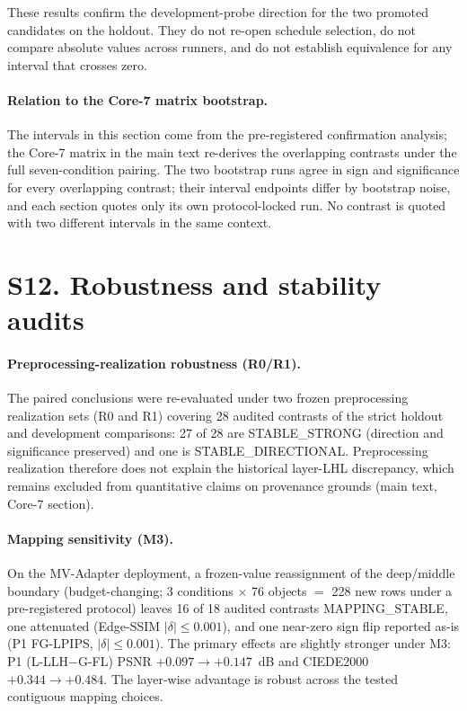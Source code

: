 \documentclass[10pt]{article}
\begin{document}
These results confirm the development-probe direction for the two promoted
candidates on the holdout. They do not re-open schedule selection, do not
compare absolute values across runners, and do not establish equivalence for
any interval that crosses zero.

\paragraph{Relation to the Core-7 matrix bootstrap.} The intervals in this
section come from the pre-registered confirmation analysis; the Core-7
matrix in the main text re-derives the overlapping contrasts under the full
seven-condition pairing. The two bootstrap runs agree in sign and
significance for every overlapping contrast; their interval endpoints differ
by bootstrap noise, and each section quotes only its own protocol-locked
run. No contrast is quoted with two different intervals in the same context.

\section{S12. Robustness and stability audits}

\paragraph{Preprocessing-realization robustness (R0/R1).}
The paired conclusions were re-evaluated under two frozen preprocessing
realization sets (R0 and R1) covering 28 audited contrasts of the strict
holdout and development comparisons: 27 of 28 are STABLE\_STRONG (direction
and significance preserved) and one is STABLE\_DIRECTIONAL. Preprocessing
realization therefore does not explain the historical layer-LHL discrepancy,
which remains excluded from quantitative claims on provenance grounds (main
text, Core-7 section).

\paragraph{Mapping sensitivity (M3).}
On the MV-Adapter deployment, a frozen-value reassignment of the
deep/middle boundary (budget-changing; 3 conditions $\times$ 76 objects
$=$ 228 new rows under a pre-registered protocol) leaves 16 of 18 audited
contrasts MAPPING\_STABLE, one attenuated (Edge-SSIM $|\delta|\le 0.001$),
and one near-zero sign flip reported as-is (P1 FG-LPIPS, $|\delta|\le
0.001$). The primary effects are slightly stronger under M3: P1
(L-LLH$-$G-FL) PSNR $+0.097\to+0.147$~dB and CIEDE2000
$+0.344\to+0.484$. The layer-wise advantage is robust across the tested
contiguous mapping choices.
\end{document}
